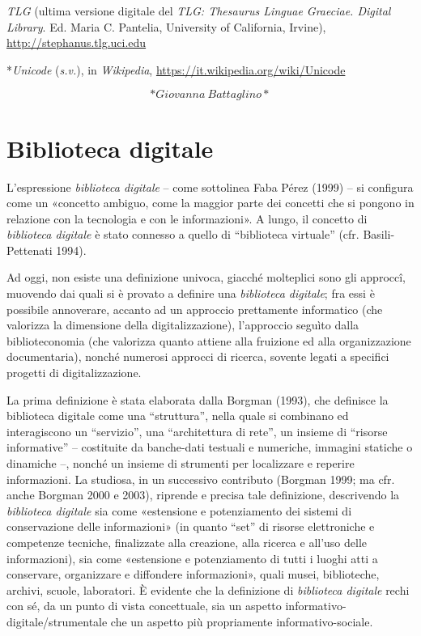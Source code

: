 \documentclass[
  b5paper,
  twoside,
  12pt,
  chapterprefix=false,
  bibliography=totocnumbered,
  parskip=false]{scrbook}
\begin{document}
\emph{TLG} (ultima versione digitale del \emph{TLG: Thesaurus Linguae Graeciae.
Digital Library}. Ed. Maria C. Pantelia, University of California,
Irvine),
\url{http://stephanus.tlg.uci.edu}

*\emph{Unicode} (\emph{s.v.}), in \emph{Wikipedia},
\url{https://it.wikipedia.org/wiki/Unicode}

\[*Giovanna~Battaglino*\]

\hypertarget{biblioteca-digitale}{%
\chapter{Biblioteca digitale}\label{biblioteca-digitale}}

L'espressione \emph{biblioteca digitale} -- come sottolinea Faba Pérez (1999)
-- si configura come un «concetto ambiguo, come la maggior parte dei
concetti che si pongono in relazione con la tecnologia e con le
informazioni». A lungo, il concetto di \emph{biblioteca digitale} è stato
connesso a quello di \enquote{biblioteca virtuale} (cfr. Basili-Pettenati 1994).

Ad oggi, non esiste una definizione univoca, giacché molteplici sono gli
approccî, muovendo dai quali si è provato a definire una \emph{biblioteca
digitale}; fra essi è possibile annoverare, accanto ad un approccio
prettamente informatico (che valorizza la dimensione della
digitalizzazione), l'approccio seguìto dalla biblioteconomia (che
valorizza quanto attiene alla fruizione ed alla organizzazione
documentaria), nonché numerosi approcci di ricerca, sovente legati a
specifici progetti di digitalizzazione.

La prima definizione è stata elaborata dalla Borgman (1993), che
definisce la biblioteca digitale come una \enquote{struttura}, nella quale si
combinano ed interagiscono un \enquote{servizio}, una \enquote{architettura di rete}, un
insieme di \enquote{risorse informative} -- costituite da banche-dati testuali e
numeriche, immagini statiche o dinamiche --, nonché un insieme di
strumenti per localizzare e reperire informazioni. La studiosa, in un
successivo contributo (Borgman 1999; ma cfr. anche Borgman 2000 e 2003),
riprende e precisa tale definizione, descrivendo la \emph{biblioteca
digitale} sia come «estensione e potenziamento dei sistemi di
conservazione delle informazioni» (in quanto \enquote{set} di risorse
elettroniche e competenze tecniche, finalizzate alla creazione, alla
ricerca e all'uso delle informazioni), sia come «estensione e
potenziamento di tutti i luoghi atti a conservare, organizzare e
diffondere informazioni», quali musei, biblioteche, archivi, scuole,
laboratori. È evidente che la definizione di \emph{biblioteca digitale} rechi
con sé, da un punto di vista concettuale, sia un aspetto
informativo-digitale/strumentale che un aspetto più propriamente
informativo-sociale.
\end{document}
